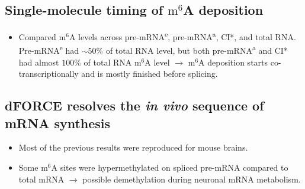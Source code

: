 \documentclass{article}
\begin{document}
\subsection{Single-molecule timing of $\text{m}^{6}$A deposition}
\begin{itemize}		
	\item Compared $\text{m}^{6}$A levels across pre-mRNA\textsuperscript{e}, pre-mRNA\textsuperscript{a}, CI*, and total RNA. Pre-mRNA\textsuperscript{e} had $\sim 50 \%$ of total RNA level, but both pre-mRNA\textsuperscript{a} and CI* had almost $100\%$ of total RNA $\text{m}^{6}$A level $\to$ $\text{m}^{6}$A deposition starts co-transcriptionally  and is mostly finished before splicing.
\end{itemize}

\subsection{dFORCE resolves the \textit{in vivo} sequence of mRNA synthesis}
\begin{itemize}		
	\item Most of the previous results were reproduced for mouse brains.
	\item Some $\text{m}^{6}$A sites were hypermethylated on spliced pre-mRNA compared to total mRNA $\to$ possible demethylation during neuronal mRNA metabolism.
\end{itemize}
	
	
	
	
	
	
	
	
	
	
	
	
	
	
\end{document}
